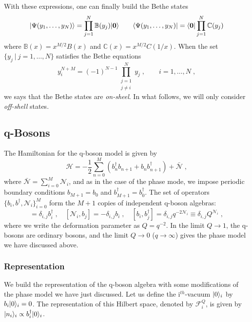 \documentclass[a4paper,11pt]{amsart}
\begin{document}
With these expressions, one can finally build the Bethe states
\begin{equation}
  \lvert\Psi(y_1, \dots, y_N)\rangle = \prod_{j=1}^N \mathbb{B}(y_j) \lvert\bm{0}\rangle \qquad 
  \langle\Psi(y_1, \dots, y_N)\rvert = \langle\bm{0}\rvert\prod_{j=1}^N \mathbb{C}(y_j) 
\end{equation}
where \(\mathbb{B}(x) = x^{M/2} B(x)\) and \(\mathbb{C}(x) = x^{M/2} C(1/x)\).
When the set \(\{ y_j \ | \ j
=1, \dots , N\}\) satisfies the Bethe equations
\begin{equation}
\label{eq:bethe_eq}
  y^{N + M}_i = (-1)^{N-1} \prod_{\substack{j = 1 \\ j \neq i}}^N y_j\; , \qquad i = 1, \dots, N\; , 
\end{equation}
we says that the Bethe states are \emph{on-sheel}. In what follows, we will 
only consider \emph{off-shell} states. 


\subsection{q-Bosons}
The Hamiltonian for the q-boson model is
given by
\begin{equation}
  \mathcal{H} = -\frac{1}{2} \sum_{n=0}^M
  \left(b_n^\dagger b_{n+1} + b_n b_{n+1}^\dagger \right) + \bar{\mathcal{N}}\; ,
\end{equation}
where \(\bar{\mathcal{N}} = \sum_{i=0}^M \mathcal{N}_i\), and as in
the case of the phase mode, we impose periodic boundary conditions
\(b_{M+1} = b_0\) and \(b_{M+1}^\dagger = b_0^\dagger\). The set of
operators \(\{b_i, b^\dagger,\mathcal{N}_i\}_{i=0}^M\) form the
\(M+1\) copies of independent q-boson algebras:
\begin{equation}
[\mathcal{N}_i, b_j^\dagger]=\delta_{i,j} b_i^\dagger\; , \quad 
[\mathcal{N}_i, b_j]=-\delta_{i,j}b_i\; , \quad
[b_i, b_j^\dagger]= \delta_{i,j} q^{-2\mathcal{N}_i}  \equiv \delta_{i,j} Q^{\mathcal{N}_i}\; , 
\end{equation}
where we write the deformation parameter as \(Q = q^{-2}\). 
In the limit \(Q\to 1\), the q-bosons are ordinary bosons, and 
the limit \(Q\to 0\) (\(q\to \infty\)) gives the phase model we have discussed above. 

\subsubsection{Representation}
We build the representation of the q-boson algebra with some modifications of the phase 
model we have just discussed. Let us define the i\(^{th}\)-vacuum \(\lvert0\rangle_i\) by
\(b_i\lvert0\rangle_i = 0\). The representation of this Hilbert space, denoted by
\(\mathcal{F}_i^Q\), is given by \(\lvert n_i\rangle_i \propto b_i^\dagger \lvert0\rangle_i\).
\end{document}
